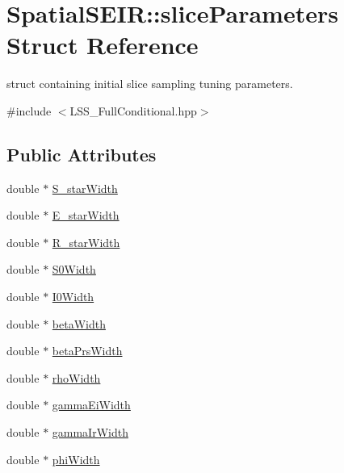 \hypertarget{structSpatialSEIR_1_1sliceParameters}{\section{Spatial\-S\-E\-I\-R\-:\-:slice\-Parameters Struct Reference}
\label{structSpatialSEIR_1_1sliceParameters}
}


struct containing initial slice sampling tuning parameters.  




{\ttfamily \#include $<$L\-S\-S\-\_\-\-Full\-Conditional.\-hpp$>$}

\subsection*{Public Attributes}
\begin{DoxyCompactItemize}
\item 
double $\ast$ \hyperlink{structSpatialSEIR_1_1sliceParameters_a2f90b463a0c19e9ddee18b6b7201aa3a}{S\-\_\-star\-Width}
\item 
double $\ast$ \hyperlink{structSpatialSEIR_1_1sliceParameters_af81f880dad34e409ec23d3dee95cde9d}{E\-\_\-star\-Width}
\item 
double $\ast$ \hyperlink{structSpatialSEIR_1_1sliceParameters_a11f8948e29f2b1753c34b3665de8b0a5}{R\-\_\-star\-Width}
\item 
double $\ast$ \hyperlink{structSpatialSEIR_1_1sliceParameters_a2413af0d867a2b39d3d614bfc61b1a08}{S0\-Width}
\item 
double $\ast$ \hyperlink{structSpatialSEIR_1_1sliceParameters_af927171f24f8b4f4f4f44cbc3dcabb2a}{I0\-Width}
\item 
double $\ast$ \hyperlink{structSpatialSEIR_1_1sliceParameters_a890369737115cf27a7f5f86fca564248}{beta\-Width}
\item 
double $\ast$ \hyperlink{structSpatialSEIR_1_1sliceParameters_a1e503332bf376006b6e46c4f5eb2c1ab}{beta\-Prs\-Width}
\item 
double $\ast$ \hyperlink{structSpatialSEIR_1_1sliceParameters_a484236433bd95049ce83b7fbfe90407f}{rho\-Width}
\item 
double $\ast$ \hyperlink{structSpatialSEIR_1_1sliceParameters_aa390f8753fbf788e73dcd9c865fd78ee}{gamma\-Ei\-Width}
\item 
double $\ast$ \hyperlink{structSpatialSEIR_1_1sliceParameters_aa6e7b44947455b6376ef7eb2258e599f}{gamma\-Ir\-Width}
\item 
double $\ast$ \hyperlink{structSpatialSEIR_1_1sliceParameters_a11c8c9bdef914a68fce64b75ee19752c}{phi\-Width}
\end{DoxyCompactItemize}


